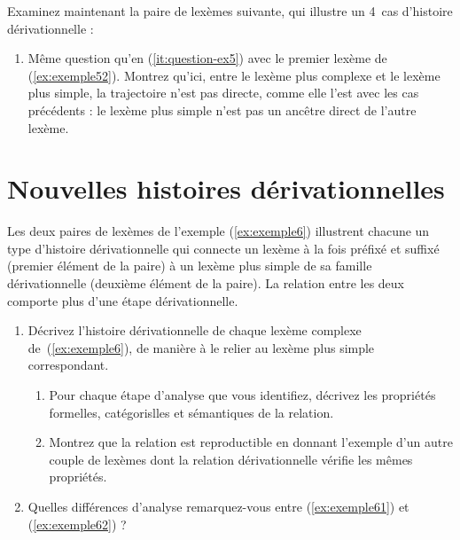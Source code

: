 Examinez maintenant la paire de lexèmes suivante, qui illustre un 4\ieme\ cas d'histoire dérivationnelle :

\begin{exe} 
  \ex \label{ex:exemple52} \bitumisationexcinq
\end{exe}


\begin{enumerate}
\item Même question qu'en (\ref{it:question-ex5}) avec le premier lexème de (\ref{ex:exemple52}).  Montrez qu'ici, entre le lexème plus complexe et le lexème plus simple, la trajectoire n'est pas directe, comme elle l'est avec les cas précédents : le lexème plus simple n'est pas un ancêtre direct de l'autre lexème.
\end{enumerate}

\section{Nouvelles histoires dérivationnelles}

Les deux paires de lexèmes de l'exemple (\ref{ex:exemple6})  illustrent chacune un type d'histoire dérivationnelle qui connecte un lexème à la fois préfixé et suffixé  (premier élément de la paire) à un lexème plus simple de sa famille dérivationnelle  (deuxième élément de la paire). La relation entre les deux comporte plus d'une étape dérivationnelle. 

\begin{exe}
  \ex \label{ex:exemple6}
  \begin{xlist}
    \ex \label{ex:exemple61} \antigrippalexsix
    \ex \label{ex:exemple62} \postglaciaireexsix
  \end{xlist}
\end{exe}

\begin{enumerate}
\item Décrivez l'histoire dérivationnelle de chaque lexème complexe de~(\ref{ex:exemple6}), de manière à le relier au lexème plus simple correspondant.  
  \begin{enumerate}
  \item Pour chaque étape d'analyse que vous identifiez, décrivez les propriétés formelles, catégorislles et sémantiques de la relation.
  \item Montrez que la relation est reproductible en donnant l'exemple d'un autre couple de lexèmes dont la relation dérivationnelle vérifie les mêmes propriétés.
  \end{enumerate}
\item Quelles différences d'analyse remarquez-vous entre (\ref{ex:exemple61}) et (\ref{ex:exemple62}) ?
\end{enumerate}

